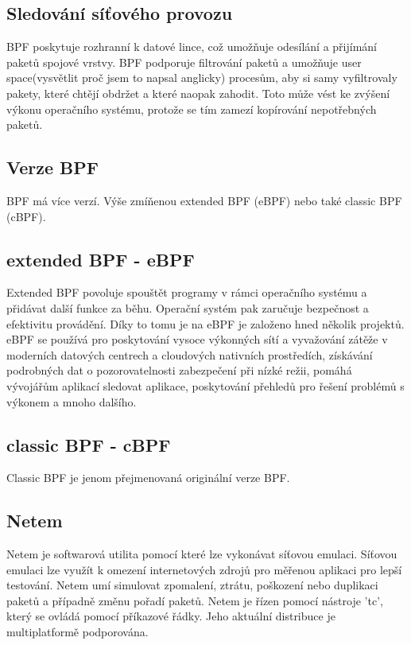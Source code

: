 \subsection*{Sledování síťového provozu}
BPF poskytuje rozhranní k datové lince, což umožňuje odesílání a přijímání paketů spojové vrstvy. BPF podporuje filtrování paketů a umožňuje user space(vysvětlit proč jsem to napsal anglicky) procesům,
aby si samy vyfiltrovaly pakety, které chtějí obdržet a které naopak zahodit. Toto může vést ke zvýšení výkonu operačního systému, protože se tím zamezí kopírování nepotřebných paketů.

\subsection*{Verze BPF}
BPF má více verzí. Výše zmíňenou extended BPF (eBPF) nebo také classic BPF (cBPF).

\subsection*{extended BPF - eBPF}
Extended BPF povoluje spouštět programy v rámci operačního systému a přidávat další funkce za běhu.
Operační systém pak zaručuje bezpečnost a efektivitu provádění. Díky to tomu je na eBPF je založeno hned několik projektů.
eBPF se používá pro  poskytování vysoce výkonných sítí a vyvažování zátěže v moderních datových centrech a cloudových nativních prostředích,
získávání podrobných dat o pozorovatelnosti zabezpečení při nízké režii, pomáhá vývojářům aplikací sledovat aplikace,
poskytování přehledů pro řešení problémů s výkonem a mnoho dalšího.

\subsection*{classic BPF - cBPF}
Classic BPF je jenom přejmenovaná originální verze BPF.

\subsection{Netem}\cite{netem}
Netem je softwarová utilita pomocí které lze vykonávat síťovou emulaci. Síťovou emulaci lze využít k omezení internetových zdrojů pro měřenou aplikaci pro lepší testování.
Netem umí simulovat zpomalení, ztrátu, poškození nebo duplikaci paketů a případně změnu pořadí paketů. Netem je řízen pomocí nástroje 'tc', který se ovládá pomocí příkazové řádky.
Jeho aktuální distribuce je multiplatformě podporována.

